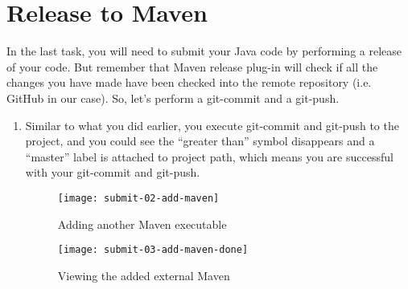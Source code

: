 
\chapter{Release to Maven}

In the last task, you will need to submit your Java code by performing a release of your code. But remember that Maven release plug-in will check if all the changes you have made have been checked into the remote repository (i.e. GitHub in our case). So, let's perform a git-commit and a git-push.

\begin{enumerate}

\begin{figure}
\hspace{-1em}
\begin{minipage}{0.5\textwidth}
\centering
\texttt{[image: simple-code-05-commit]}
\caption{Performing a git-commit/push before preparing a release\label{simple-code-05-commit}}
\end{minipage}
\hfill
\begin{minipage}{0.5\textwidth}
\centering
\texttt{[image: submit-01-preference]}
\caption{Starting to add an external Maven executable\label{submit-01-preference}}
\end{minipage}
\hspace{-1em}
\end{figure}

\item Similar to what you did earlier, you execute git-commit and git-push to the project, and you could see the ``greater than'' symbol disappears and a ``master'' label is attached to project path, which means you are successful with your git-commit and git-push.

\begin{figure}
\hspace{-2em}
\begin{minipage}{0.5\textwidth}
\centering
\texttt{[image: submit-02-add-maven]}
\caption{Adding another Maven executable\label{submit-02-add-maven}}
\end{minipage}
\hfill
\begin{minipage}{0.5\textwidth}
\centering
\texttt{[image: submit-03-add-maven-done]}
\caption{Viewing the added external Maven\label{submit-03-add-maven-done}}
\end{minipage}
\hspace{-2em}
\end{figure}


\end{enumerate}
